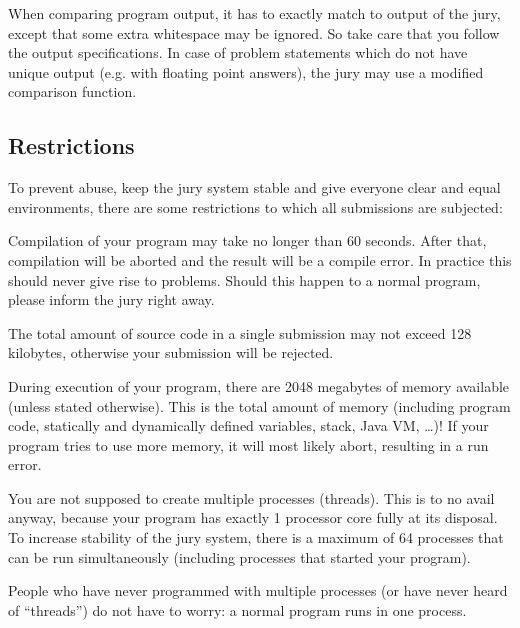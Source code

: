When comparing program output, it has to exactly match to output of
the jury, except that some extra whitespace may be ignored. So take
care that you follow the output specifications. In case of problem
statements which do not have unique output (e.g. with floating point
answers), the jury may use a modified comparison function.

\subsection{Restrictions}\label{runlimits}

To prevent abuse, keep the jury system stable and give everyone
clear and equal environments, there are some restrictions to which all
submissions are subjected:

\begin{description}
\item[compile time]
Compilation of your program may take no longer than 60
seconds. After that, compilation will be aborted and the result will
be a compile error. In practice this should never give rise to
problems. Should this happen to a normal program, please inform the
jury right away.

\item[source size]
The total amount of source code in a single submission may not exceed
128 kilobytes, otherwise your submission will be rejected.

\item[memory]
During execution of your program, there are 2048 megabytes of
memory available (unless stated otherwise). This is the total
amount of memory (including program code, statically and dynamically defined
variables, stack, Java VM, \dots)! If your program tries to use
more memory, it will most likely abort, resulting in a run
error.

\item[number of processes]
You are not supposed to create multiple processes (threads). This is
to no avail anyway, because your program has exactly 1 processor core fully
at its disposal. To increase stability of the jury system, there is a
maximum of 64 processes that can be run simultaneously
(including processes that started your program).

People who have never programmed with multiple processes (or have
never heard of ``threads'') do not have to worry: a normal program
runs in one process.

\end{description}

